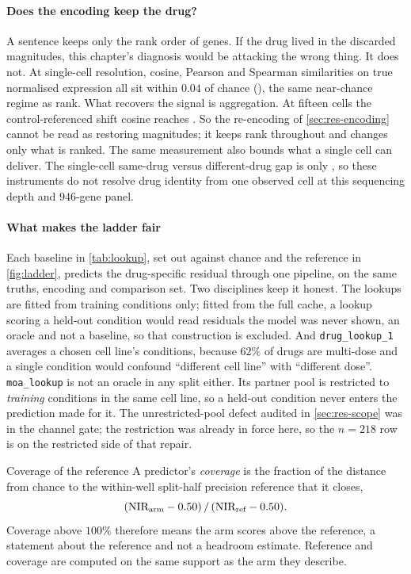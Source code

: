 \paragraph{Does the encoding keep the drug?} A sentence keeps only the rank
order of genes. If the drug lived in the discarded magnitudes, this chapter's
diagnosis would be attacking the wrong thing. It does not. At single-cell
resolution, cosine, Pearson and Spearman similarities on true normalised
expression all sit within $0.04$ of chance
(), the same near-chance regime as rank.
What recovers the signal is aggregation. At fifteen cells the control-referenced
shift cosine reaches . So the re-encoding of
\cref{sec:res-encoding} cannot be read as restoring magnitudes; it keeps rank
throughout and changes only what is ranked. The same measurement also bounds
what a single cell can deliver. The single-cell same-drug versus different-drug
gap is only
, so these instruments do not resolve drug identity
from one observed cell at this sequencing depth and $946$-gene panel.

\paragraph{What makes the ladder fair} Each baseline in \cref{tab:lookup}, set
out against chance and the reference in \cref{fig:ladder}, predicts the
drug-specific residual through one pipeline, on the same truths, encoding and
comparison set. Two disciplines keep it honest. The lookups are
fitted from training conditions only; fitted from the full cache, a lookup
scoring a held-out condition would read residuals the model was never shown, an
oracle and not a baseline, so that construction is excluded. And
\texttt{drug\_lookup\_1} averages a chosen cell line's conditions, because $62\%$
of drugs are multi-dose and a single condition would confound ``different cell
line'' with ``different dose''. \texttt{moa\_lookup} is not an oracle in any
split either. Its partner pool is restricted to \emph{training} conditions in the
same cell line, so a held-out condition never enters the prediction made for it.
The unrestricted-pool defect audited in \cref{sec:res-scope} was in the channel
gate; the restriction was already in force here, so the $n = \num{218}$ row is on
the restricted side of that repair.

\begin{defn}{Coverage of the reference}
A predictor's \emph{coverage} is the fraction of the distance from chance to the
within-well split-half precision reference that it closes,
\[
  (\textrm{NIR}_{\text{arm}} - 0.50)\,/\,(\textrm{NIR}_{\text{ref}} - 0.50).
\]
Coverage above $100\%$ therefore means the arm scores above the reference, a
statement about the reference and not a headroom estimate. Reference and coverage
are computed on the same support as the arm they describe.
\end{defn}

